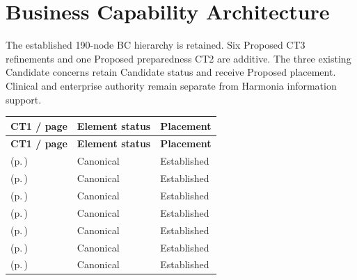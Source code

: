\part{Business Capability Architecture}\label{model:bc}
The established 190-node BC hierarchy is retained. Six Proposed CT3 refinements and one Proposed preparedness CT2 are additive. The three existing Candidate concerns retain Candidate status and receive Proposed placement. Clinical and enterprise authority remain separate from Harmonia information support.

\begingroup\small\setlength{\TableWidth}{\dimexpr\linewidth-6\tabcolsep-4\arrayrulewidth\relax}
\begin{longtable}{|>{\raggedright\arraybackslash}p{0.64\TableWidth}|>{\raggedright\arraybackslash}p{0.18\TableWidth}|>{\raggedright\arraybackslash}p{0.18\TableWidth}|}
\hline\rowcolor{TableHead}\textbf{CT1 / page} & \textbf{Element status} & \textbf{Placement}\\\hline\endfirsthead
\hline\rowcolor{TableHead}\textbf{CT1 / page} & \textbf{Element status} & \textbf{Placement}\\\hline\endhead
\hline\endfoot
\nameref{cap:bc-individual-care-delivery} (p.\,\pageref{cap:bc-individual-care-delivery}) & Canonical & Established\\\hline
\nameref{cap:bc-care-access-coordination} (p.\,\pageref{cap:bc-care-access-coordination}) & Canonical & Established\\\hline
\nameref{cap:bc-health-rights-advocacy-participation} (p.\,\pageref{cap:bc-health-rights-advocacy-participation}) & Canonical & Established\\\hline
\nameref{cap:bc-diagnostic-therapeutic-clinical-support-services} (p.\,\pageref{cap:bc-diagnostic-therapeutic-clinical-support-services}) & Canonical & Established\\\hline
\nameref{cap:bc-health-products-clinical-technology} (p.\,\pageref{cap:bc-health-products-clinical-technology}) & Canonical & Established\\\hline
\nameref{cap:bc-clinical-quality-safety-improvement} (p.\,\pageref{cap:bc-clinical-quality-safety-improvement}) & Canonical & Established\\\hline
\nameref{cap:bc-community-health-wellbeing} (p.\,\pageref{cap:bc-community-health-wellbeing}) & Canonical & Established\\\hline

\end{longtable}

